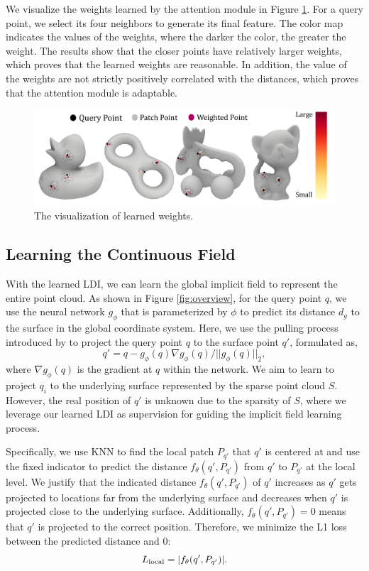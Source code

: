 \documentclass[letterpaper]{article} %
\begin{document}
We visualize the weights learned by the attention module in Figure \ref{fig:weight}. For a query point, we select its four neighbors to generate its final feature. The color map indicates the values of the weights, where the darker the color, the greater the weight. The results show that the closer points have relatively larger weights, which proves that the learned weights are reasonable. In addition, the value of the weights are not strictly positively correlated with the distances, which proves that the attention module is adaptable.
\begin{figure}
    \centering
    \includegraphics[width=1.0\linewidth]{attention_vis.pdf}
    \caption{The visualization of learned weights.}
    \label{fig:weight}
\end{figure}

\subsection{Learning the Continuous Field}

With the learned LDI, we can learn the global implicit field to represent the entire point cloud. As shown in Figure \ref{fig:overview}, for the query point $q$, we use the neural network $g_\phi$ that is parameterized by $\phi$ to predict its distance $d_g$ to the surface in the global coordinate system. Here, we use the pulling process introduced by \cite{ma2021neural} to project the query point $q$ to the surface point $q'$, formulated as,
\begin{equation}
\label{eq:pulling}
q'=q-{g_\phi(q)}\nabla{g_\phi(q)}/||{g_\phi}(q)||_2,
\end{equation}
where $\nabla{g_\phi(q)}$ is the gradient at $q$ within the network. We aim to learn to project $q_i$ to the underlying surface represented by the sparse point cloud $S$. However, the real position of $q'$ is unknown due to the sparsity of $S$, where we leverage our learned LDI as supervision for guiding the implicit field learning process.

Specifically, we use KNN to find the local patch $P_{q'}$ that $q'$ is centered at and use the fixed indicator to predict the distance $f_\theta(q', P_{q'})$ from $q'$ to $P_{q'}$ at the local level. We justify that the indicated distance $f_\theta(q', P_{q'})$ of $q'$ increases as $q'$ gets projected to locations far from the underlying surface and decreases when $q'$ is projected close to the underlying surface. Additionally, $f_\theta(q', P_{q'}) = 0$ means that $q'$ is projected to the correct position. Therefore, we minimize the L1 loss between the predicted distance and 0:
\begin{equation}
\label{eq:local_loss}
L_{\rm{local}} = |f_\theta(q', P_{q'})|.
\end{equation}
\end{document}
